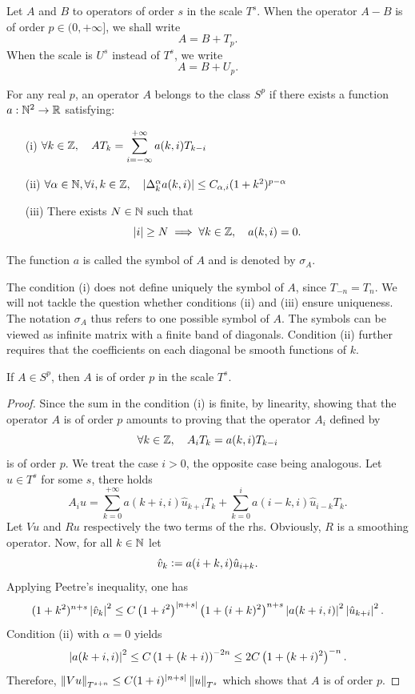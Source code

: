 \documentclass[a4paper]{article}
\begin{document}
\begin{Def}
	\label{DefEquivModTp}
	Let $A$ and $B$ to operators of order $s$ in the scale $T^s$. When the operator 
	$A - B$ is of order $p \in (0,+\infty]$, we shall write 
	\[A = B + T_p.\]
	When the scale is $U^s$ instead of $T^s$, we write 
	\[A = B + U_p.\]
\end{Def}

\begin{Def}
	For any real $p$, an operator $A$ belongs to the class $S^{p}$ if there exists a function $a : \mathbb{N}^2 \to \mathbb{R}$ satisfying: 
	\begin{itemize} 
		\item[(i)]$	\forall k \in \mathbb{Z}, \quad A T_k = \displaystyle\sum_{i = -\infty}^{+\infty} a(k,i)T_{k-i}$
		\item[(ii)]$	\forall \alpha \in \mathbb{N}, \forall  i,k  \in \mathbb{Z}, \quad  \left\lvert \Delta_k^\alpha a(k,i) \right\rvert \leq C_{\alpha,i} (1 + k^2)^{p - \alpha}$
		\item[(iii)] There exists $N \in \mathbb{N}$ such that
		\[\left\lvert i \right\rvert \geq N \implies \forall k \in \mathbb{Z}, \quad a(k,i) = 0.\]  
	\end{itemize}
	The function $a$ is called the symbol of $A$ and is denoted by $\sigma_A$. 
\end{Def}
\begin{Rem}
	The condition (i) does not define uniquely the symbol of $A$, since $T_{-n} = T_n$. We will not tackle the question whether conditions (ii) and (iii) ensure uniqueness. The notation $\sigma_A$ thus refers to one possible symbol of $A$. The symbols can be viewed as infinite matrix with a finite band of diagonals. Condition (ii) further requires that the coefficients on each diagonal be smooth functions of $k$. 
\end{Rem}
\begin{Lem}
	If $A\in S^p$, then $A$ is of order $p$ in the scale $T^s$. 
\end{Lem}
\begin{proof}
	Since the sum in the condition (i) is finite, by linearity, showing that the operator $A$ is of order $p$ amounts to proving that the operator $A_i$ defined by
	\[ \forall k \in \mathbb{Z}, \quad  A_i T_k = a(k,i) T_{k-i} \]
	is of order $p$. We treat the case $i > 0$, the opposite case being analogous. Let $u \in T^s$ for some $s$, there holds 
	\[ A_i u = \sum_{k = 0}^{+ \infty} a(k + i,i)\hat{u}_{k + i}T_k + \sum_{k = 0}^{i} a(i - k,i) \hat{u}_{i - k}T_k.\]
	Let $Vu$ and $Ru$ respectively the two terms of the rhs. Obviously, $R$ is a smoothing operator. Now, for all $k \in \mathbb{N}$ let
	\[\hat{v}_k \mathrel{\mathop:}= a(i + k,i) \hat{u}_{i + k}.\]
	Applying Peetre's inequality, one has
	\[(1 + k^2)^{n + s}\left\lvert \hat{v}_k \right\rvert^2 \leq C \left(1 + i^2\right)^{\left\lvert n + s \right\rvert}\left(1 + (i + k)^2\right)^{n + s} \left\lvert a(k + i,i) \right\rvert^2 \left\lvert \hat{u}_{k+i} \right\rvert^2.\]
	Condition (ii) with $\alpha = 0$ yields
	\[\left\lvert a(k+i,i) \right\rvert^2 \leq C\left(1 + (k+i)\right)^{-2n} \leq 2C \left(1 + (k+i)^2\right)^{-n}.\]
	Therefore, $\left\|V u\right\|_{T^{s + n}} \leq C(1 + i)^{\left\lvert n + s \right\rvert} \left\|u\right\|_{T^s}$ which shows that $A$ is of order $p$.
\end{proof}
\end{document}

